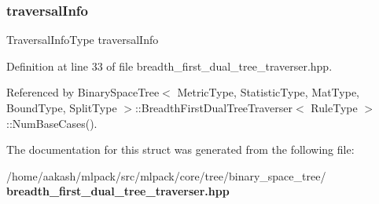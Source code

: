 \subsubsection{traversal\+Info}
{\footnotesize\ttfamily Traversal\+Info\+Type traversal\+Info}



Definition at line 33 of file breadth\+\_\+first\+\_\+dual\+\_\+tree\+\_\+traverser.\+hpp.



Referenced by Binary\+Space\+Tree$<$ Metric\+Type, Statistic\+Type, Mat\+Type, Bound\+Type, Split\+Type $>$\+::\+Breadth\+First\+Dual\+Tree\+Traverser$<$ Rule\+Type $>$\+::\+Num\+Base\+Cases().



The documentation for this struct was generated from the following file\+:\begin{DoxyCompactItemize}
\item 
/home/aakash/mlpack/src/mlpack/core/tree/binary\+\_\+space\+\_\+tree/\textbf{ breadth\+\_\+first\+\_\+dual\+\_\+tree\+\_\+traverser.\+hpp}\end{DoxyCompactItemize}
